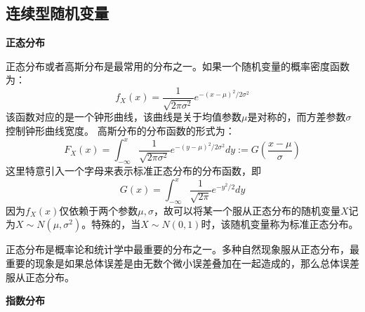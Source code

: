 \documentclass{ctexart}
\begin{document}
            \subsection{连续型随机变量}
                \textbf{正态分布} 
                
                正态分布或者高斯分布是最常用的分布之一。如果一个随机变量的概率密度函数为：
                \begin{equation}
                    f_X(x) = \frac{1}{\sqrt{2\pi \sigma^2}}e^{-(x-\mu)^2/2\sigma^2}
                \end{equation}
                该函数对应的是一个钟形曲线，该曲线是关于均值参数$\mu$是对称的，而方差参数$\sigma$控制钟形曲线宽度。
                高斯分布的分布函数的形式为：
                \begin{equation}
                    F_X(x) = \int_{-\infty}^x\frac{1}{\sqrt{2\pi \sigma^2}}e^{-(y-\mu)^2/2\sigma^2}dy:=G(\frac{x-\mu}{\sigma})
                \end{equation}
                这里特意引入一个字母来表示标准正态分布的分布函数，即
                \begin{equation}
                    G(x) = \int_{-\infty}^x \frac{1}{\sqrt{2\pi}}e^{-y^2/2}dy
                \end{equation}
                因为$f_X(x)$仅依赖于两个参数$\mu,\sigma$，故可以将某一个服从正态分布的随机变量$X$记为$X\sim N(\mu,\sigma^2)$。特殊的，当$X\sim N(0,1)$时，该随机变量称为标准正态分布。
                
                正态分布是概率论和统计学中最重要的分布之一。多种自然现象服从正态分布，最重要的现象是如果总体误差是由无数个微小误差叠加在一起造成的，那么总体误差服从正态分布。
                
                \textbf{指数分布}
                
\end{document}
